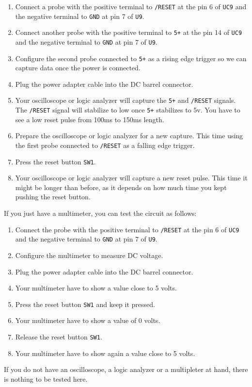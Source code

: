\begin{enumerate}
  \item Connect a probe with the positive terminal to {\tt /RESET} at the pin 6 of {\tt UC9} and the negative terminal to {\tt GND} at pin 7 of {\tt U9}.
  \item Connect another probe with the positive terminal to {\tt 5+} at the pin 14 of {\tt UC9} and the negative terminal to {\tt GND} at pin 7 of {\tt U9}.
  \item Configure the second probe connected to {\tt 5+} as a rising edge trigger so we can capture data once the power is connected.
  \item Plug the power adapter cable into the DC barrel connector.
  \item Your oscilloscope or logic analyzer will capture the {\tt 5+} and {\tt /RESET} signals. The {\tt /RESET} signal will stabilize to low once {\tt 5+} stabilizes to 5v. You have to see a low reset pulse from 100ms to 150ms length.
  \item Prepare the oscilloscope or logic analyzer for a new capture. This time using the first probe connected to {\tt /RESET} as a falling edge trigger.
  \item Press the reset button {\tt SW1}.
  \item Your oscilloscope or logic analyzer will capture a new reset pulse. This time it might be longer than before, as it depends on how much time you kept pushing the reset button.
\end{enumerate}

If you just have a multimeter, you can test the circuit as follows:

\begin{enumerate}
  \item Connect the probe with the positive terminal to {\tt /RESET} at the pin 6 of {\tt UC9} and the negative terminal to {\tt GND} at pin 7 of {\tt U9}.
  \item Configure the multimeter to measure DC voltage.
  \item Plug the power adapter cable into the DC barrel connector.
  \item Your multimeter have to show a value close to 5 volts.
  \item Press the reset button {\tt SW1} and keep it pressed.
  \item Your multimeter have to show a value of 0 volts.
  \item Release the reset button {\tt SW1}.
  \item Your multimeter have to show again a value close to 5 volts.
\end{enumerate}

If you do not have an oscilloscope, a logic analyzer or a multipleter at hand, there is nothing to be tested here.
